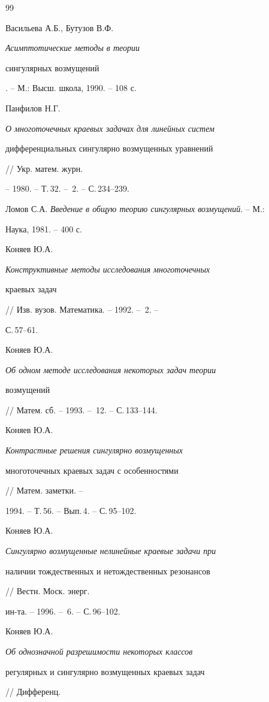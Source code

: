\begin{thebibliography}{99} 


 




Васильева А.Б., Бутузов В.Ф. {\em Асимптотические методы в теории 


сингулярных возмущений}. -- М.: Высш. школа, 1990. -- 108 с. 




Панфилов Н.Г. {\em О многоточечных краевых задачах для линейных систем 


дифференциальных сингулярно возмущенных уравнений} // Укр. матем. журн. 


-- 1980. -- Т.\,32. -- \No\,2. -- С.\,234--239. 




Ломов С.А. {\em Введение в общую теорию сингулярных возмущений}. -- М.: 


Наука, 1981. -- 400 с. 




Коняев Ю.А. {\em Конструктивные методы исследования многоточечных 


краевых задач} // Изв. вузов. Математика. -- 1992. -- \No\,2. -- 


С.\,57--61. 




Коняев Ю.А. {\em Об одном методе исследования некоторых задач теории 


возмущений} // Матем. сб. -- 1993. -- \No\,12. -- С.\,133--144. 




Коняев Ю.А. {\em Контрастные решения сингулярно возмущенных 


многоточечных краевых задач с особенностями} // Матем. заметки. -- 


1994. -- Т.\,56. -- Вып.\,4. -- С.\,95--102. 




Коняев Ю.А. {\em Сингулярно возмущенные нелинейные краевые задачи при 


наличии тождественных и нетождественных резонансов} // Вестн. Моск. энерг.


ин-та. -- 1996. -- \No\,6. -- С.\,96--102.




Коняев Ю.А. {\em Об однозначной разрешимости некоторых классов 


регулярных и сингулярно возмущенных краевых задач} // Дифференц. 



\end{thebibliography}
